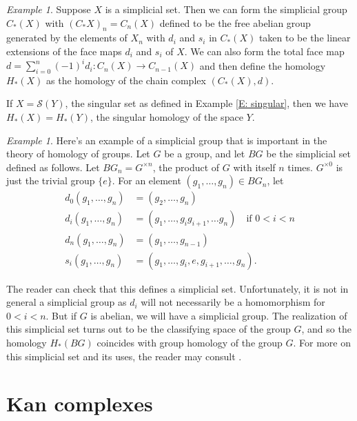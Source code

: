 \documentclass[12pt]{article}
\theoremstyle{plain}
\theoremstyle{definition}
\theoremstyle{remark}
\newtheorem{example}[theorem]{Example}
\newcommand{\ms}[1]{\mathscr{#1}}
\begin{document}
\begin{example}
Suppose $X$ is a simplicial set. Then we can form the simplicial group $C_*(X)$ with $(C_*X)_n=C_n(X)$ defined to be the free abelian group generated by the elements of $X_n$ with $d_i$ and $s_i$ in $C_*(X)$ taken to be the linear extensions of the face maps $d_i$ and $s_i$ of $X$. We can also form the total face map $d =\displaystyle \sum_{i=0}^n (-1)^id_i\colon C_n(X)\to C_{n-1}(X)$ and  then define the homology $H_*(X)$ as the homology of the chain complex $(C_*(X),d)$.


If $X=\ms S(Y)$, the singular set as defined in Example \ref{E: singular}, then we have $H_*(X)=H_*(Y)$, the singular homology of the space $Y$.
\end{example}





\begin{example}
Here's an example of a simplicial group that is important in the theory of homology of groups. Let $G$ be a group, and let $BG$ be the simplicial set defined as follows. Let $BG_n=G^{\times n}$, the product of $G$ with itself $n$ times. $G^{\times 0}$ is just the trivial group $\{e\}$. For an element $(g_1,\ldots,g_n)\in BG_n$, let 
\begin{align*}
d_0(g_1,\ldots, g_n)&= (g_2,\ldots, g_n)\\
d_i(g_1,\ldots, g_n)&= (g_1,\ldots, g_ig_{i+1},\ldots g_n)\quad\text{if $0<i<n$}\\
d_n(g_1,\ldots, g_n)&= (g_1,\ldots, g_{n-1})\\
s_i(g_1,\ldots, g_n)&= (g_1,\ldots,g_i,e,g_{i+1},\ldots, g_n).
\end{align*}
\end{example}


The reader can check that this defines a simplicial set. Unfortunately, it is not in general a simplicial group as $d_i$ will not necessarily be a homomorphism for $0<i<n$. But if $G$ is abelian, we will have a simplicial group. 
The realization of this simplicial set turns out to be  the classifying space of the group $G$, and so the homology $H_*(BG)$ coincides with group homology of the group $G$. For more on this simplicial set and its uses, the reader may consult \cite[Chapter 8]{WEIB}. 








\section{Kan complexes}\label{S: Kan}
\end{document}
